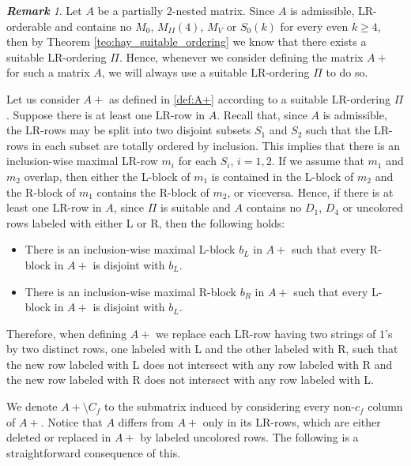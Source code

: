 \documentclass[12pt]{book}
\theoremstyle{plain}
\theoremstyle{remark}
\newtheorem{remark}[teo]{\textbf{\textit{Remark}}}
\begin{document}
\begin{remark}\label{obs:props_de_A+_suitable}
Let $A$ be a partially $2$-nested matrix. Since $A$ is admissible, LR-orderable and contains no $M_0$, $M_{II}(4)$, $M_V$ or $S_0(k)$ for every even $k \geq 4$, then by Theorem \ref{teo:hay_suitable_ordering} we know that there exists a suitable LR-ordering $\Pi$. Hence, whenever we consider defining the matrix $A+$ for such a matrix $A$, we will always use a suitable LR-ordering $\Pi$ to do so.

Let us consider $A+$ as defined in \ref{def:A+} according to a suitable LR-ordering $\Pi$. Suppose there is at least one LR-row in $A$. Recall that, since $A$ is admissible, the LR-rows may be split into two disjoint subsets $S_1$ and $S_2$ such that the LR-rows in each subset are totally ordered by inclusion. This implies that there is an inclusion-wise maximal LR-row $m_i$ for each $S_i$, $i=1,2$. If we assume that $m_1$ and $m_2$ overlap, then either the L-block of $m_1$ is contained in the L-block of $m_2$ and the R-block of $m_1$ contains the R-block of $m_2$, or viceversa. Hence, if there is at least one LR-row in $A$, since $\Pi$ is suitable and $A$ contains no $D_1$, $D_4$ or uncolored rows labeled with either L or R, then the following holds:
	\begin{itemize}
		\item There is an inclusion-wise maximal L-block $b_L$ in $A+$ such that every R-block in $A+$ is disjoint with $b_L$. 
		\item There is an inclusion-wise maximal R-block $b_R$ in $A+$ such that every L-block in $A+$ is disjoint with $b_L$. 
	\end{itemize}
	
Therefore, when defining $A+$ we replace each LR-row having two strings of $1$'s by two distinct rows, one labeled with L and the other labeled with R, such that the new row labeled with L does not intersect with any row labeled with R and the new row labeled with R does not intersect with any row labeled with L. %
\end{remark}


We denote $A+ \setminus C_f$ to the submatrix induced by considering every non-$c_f$ column of $A+$. 
Notice that $A$ differs from $A+$ only in its LR-rows, which are either deleted or replaced in $A+$ by labeled uncolored rows. The following is a straightforward consequence of this.
\end{document}
